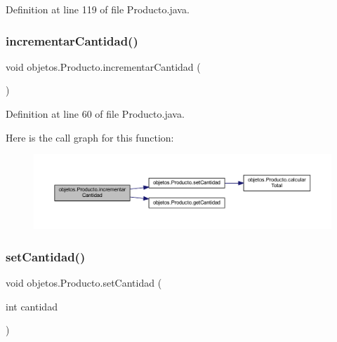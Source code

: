 Definition at line 119 of file Producto.\+java.

\mbox{\label{classobjetos_1_1_producto_afb28a08655f512fd3048a20281cbba44}} 
\subsubsection{\texorpdfstring{incrementar\+Cantidad()}{incrementarCantidad()}}
{\footnotesize\ttfamily void objetos.\+Producto.\+incrementar\+Cantidad (\begin{DoxyParamCaption}{ }\end{DoxyParamCaption})}



Definition at line 60 of file Producto.\+java.

Here is the call graph for this function\+:\nopagebreak
\begin{figure}[H]
\begin{center}
\leavevmode
\includegraphics[width=350pt]{classobjetos_1_1_producto_afb28a08655f512fd3048a20281cbba44_cgraph}
\end{center}
\end{figure}
\mbox{\label{classobjetos_1_1_producto_ae14dcc26bdc312a512627177d4e7e442}} 
\subsubsection{\texorpdfstring{set\+Cantidad()}{setCantidad()}}
{\footnotesize\ttfamily void objetos.\+Producto.\+set\+Cantidad (\begin{DoxyParamCaption}\item[{int}]{cantidad }\end{DoxyParamCaption})}



